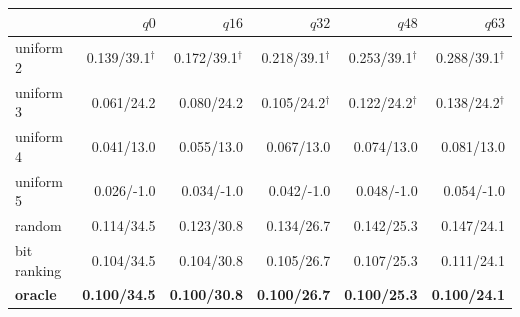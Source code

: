 \begin{tabular}{lrrrrr}
\toprule
 & $q0$ & $q16$ & $q32$ & $q48$ & $q63$ \\
\midrule
uniform 2 & 0.139/39.1$^{\dagger}$ & 0.172/39.1$^{\dagger}$ & 0.218/39.1$^{\dagger}$ & 0.253/39.1$^{\dagger}$ & 0.288/39.1$^{\dagger}$ \\
uniform 3 & 0.061/24.2 & 0.080/24.2 & 0.105/24.2$^{\dagger}$ & 0.122/24.2$^{\dagger}$ & 0.138/24.2$^{\dagger}$ \\
uniform 4 & 0.041/13.0 & 0.055/13.0 & 0.067/13.0 & 0.074/13.0 & 0.081/13.0 \\
uniform 5 & 0.026/-1.0 & 0.034/-1.0 & 0.042/-1.0 & 0.048/-1.0 & 0.054/-1.0 \\
random & 0.114/34.5 & 0.123/30.8 & 0.134/26.7 & 0.142/25.3 & 0.147/24.1 \\
bit ranking & 0.104/34.5 & 0.104/30.8 & 0.105/26.7 & 0.107/25.3 & 0.111/24.1 \\
\textbf{oracle} & \textbf{0.100/34.5} & \textbf{0.100/30.8} & \textbf{0.100/26.7} & \textbf{0.100/25.3} & \textbf{0.100/24.1} \\
\bottomrule
\end{tabular}

